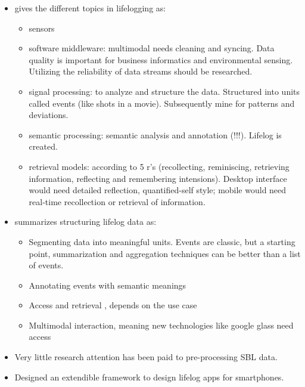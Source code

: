 \begin{itemize}
	\item \cite{gurrin2014lifelogging} gives the different topics in lifelogging as:
	\begin{itemize}
		\item sensors
		\item software middleware: multimodal needs cleaning and syncing. Data quality is important for business informatics and environmental sensing. Utilizing the reliability of data streams should be researched.
		\item signal processing: to analyze and structure the data. Structured into units called events (like shots in a movie). Subsequently mine for patterns and deviations.
		\item semantic processing: semantic analysis and annotation (!!!). Lifelog is created.
		\item retrieval models: according to 5 r's (recollecting, reminiscing, retrieving information, reflecting and remembering intensions). Desktop interface would need detailed reflection, quantified-self style; mobile would need real-time recollection or retrieval of information.
	\end{itemize}

	\item \cite{gurrin2014lifelogging} summarizes structuring lifelog data as:
	\begin{itemize}
		\item Segmenting data into meaningful units. Events are classic, but a starting point, summarization and aggregation techniques can be better than a list of events.
		\item Annotating events with semantic meanings
		\item Access and retrieval , depends on the use case
		\item Multimodal interaction, meaning new technologies like google glass need access
	\end{itemize}
	\item \cite{ali2019insight} Very little research attention has been paid to pre-processing SBL data.
	\item \cite{rawassizadeh2013ubiqlog} Designed an extendible framework to design lifelog apps for smartphones. 
\end{itemize}

